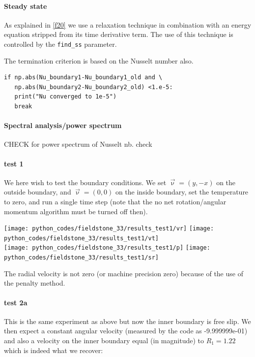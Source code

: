 \paragraph{Steady state} As explained in \ref{f20} we use a relaxation technique
in combination with an energy equation stripped from its time derivative term. 
The use of this technique is controlled by the {\tt find\_ss} parameter.

The termination criterion is based on the Nusselt number also. 
\begin{lstlisting}
if np.abs(Nu_boundary1-Nu_boundary1_old and \
   np.abs(Nu_boundary2-Nu_boundary2_old) <1.e-5:
   print("Nu converged to 1e-5")
   break
\end{lstlisting}

\paragraph{Spectral analysis/power spectrum}
CHECK \cite{brha09} for power spectrum of Nusselt nb.
check \cite{buri96,mczh05b,puhj95,rozh06,scbg90,wema98,ribr99}


\paragraph{test 1}

We here wish to test the boundary conditions. We set $\vec{\upnu}=(y,-x)$ on the outside 
boundary, and $\vec{\upnu}=(0,0)$ on the inside boundary, set the temperature to zero, 
and run a single time step (note that the no net rotation/angular momentum algorithm 
must be turned off then).

\begin{center}
\texttt{[image: python\_codes/fieldstone\_33/results\_test1/vr]}
\texttt{[image: python\_codes/fieldstone\_33/results\_test1/vt]}\\
\texttt{[image: python\_codes/fieldstone\_33/results\_test1/p]}
\texttt{[image: python\_codes/fieldstone\_33/results\_test1/sr]}
\end{center}

The radial velocity is not zero (or machine precision zero) because of the use of the 
penalty method. 

\paragraph{test 2a}
This is the same experiment as above but now the inner boundary is free slip. We then 
expect a constant angular velocity (measured by the code as  -9.999999e-01)  
and also a velocity on the inner boundary equal (in magnitude) to $R_1=1.22$ which is 
indeed what we recover:  


